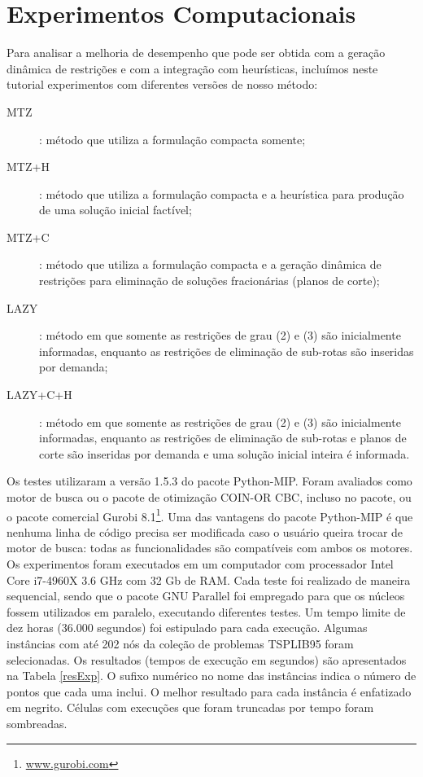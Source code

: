 \documentclass[a4paper,11pt,fleqn]{article}
\begin{document}
\section{Experimentos Computacionais} \label{secExp}

Para analisar a melhoria de desempenho que pode ser obtida com a geração
dinâmica de restrições e com a integração com heurísticas, incluímos neste tutorial experimentos com diferentes versões de nosso método:

\begin{description}
	\item[\textsc{MTZ}]: método que utiliza a formulação compacta somente;
	\item[\textsc{MTZ+H}]: método que utiliza a formulação compacta e a heurística para produção de uma solução inicial factível;
	\item[\textsc{MTZ+C}]: método que utiliza a formulação compacta e a geração dinâmica de restrições para eliminação de soluções fracionárias (planos de corte);
	\item[\textsc{LAZY}]: método em que somente as restrições de grau (2) e (3) são inicialmente informadas, enquanto as restrições de eliminação de sub-rotas são inseridas por demanda;
	\item[\textsc{LAZY+C+H}]: método em que somente as restrições de grau (2) e (3) são inicialmente informadas, enquanto as restrições de eliminação de sub-rotas e planos de corte são inseridas por demanda e uma solução inicial inteira é informada.
\end{description}

Os testes utilizaram a versão 1.5.3 do pacote Python-MIP. Foram avaliados como motor de busca ou o pacote de otimização COIN-OR CBC, incluso no pacote, ou o pacote comercial Gurobi 8.1\footnote{\url{www.gurobi.com}}. 
Uma das vantagens do pacote Python-MIP é que nenhuma linha de código precisa ser modificada caso o usuário queira trocar de motor de busca: todas as funcionalidades são compatíveis com ambos os motores. 
Os experimentos foram executados em um computador com processador Intel Core i7-4960X 3.6 GHz com 32 Gb de RAM. 
Cada teste foi realizado de maneira sequencial, sendo que o pacote GNU Parallel \citep{Tange2011} foi empregado para que os núcleos fossem utilizados em paralelo, executando diferentes testes. 
Um tempo limite de dez horas (36.000 segundos) foi estipulado para cada execução. 
Algumas instâncias com até 202 nós da coleção de problemas TSPLIB95 \citep{Reinelt95} foram selecionadas. 
Os resultados (tempos de execução em segundos) são apresentados na Tabela \ref{resExp}. O sufixo numérico no nome das instâncias indica o número de pontos que cada uma inclui. O melhor resultado para cada instância é enfatizado em negrito. Células com execuções que foram truncadas por tempo foram sombreadas.
    
\end{document}
